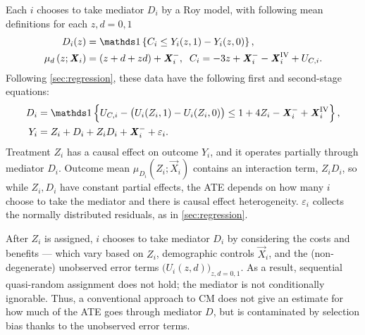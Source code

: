 Each $i$ chooses to take mediator $D_i$ by a Roy model, with following mean definitions for each $z, d = 0, 1$
\begin{align*}
    D_i(z) &= \indicator{C_i \leq Y_i(z, 1) - Y_i(z, 0)},  \\
    \mu_{d}\left(z ; \vec X_i \right) &= \left( z + d + z d \right) + \vec X_i^-,
    \;\; C_i = -3z + \vec X_i^- - \vec X_i^{\text{IV}} + U_{C,i}.
\end{align*}
Following \autoref{sec:regression}, these data have the following first and second-stage equations:
\begin{align*}
    D_i &= \indicator{U_{C,i} - \big( U_i(Z_i,1) - U_i(Z_i,0) \big)
    \leq 1 + 4 Z_i - \vec X_i^- +\vec X_i^{\mathrm{IV}}},  \\
    Y_i &= Z_i + D_i + Z_i D_i + \vec X_i^- + \varepsilon_i.
\end{align*}
Treatment $Z_i$ has a causal effect on outcome $Y_i$, and it operates partially through mediator $D_i$.
Outcome mean $\mu_{D_i}\left( Z_i; \vec X_i \right)$ contains an interaction term, $Z_i D_i$, so while $Z_i,D_i$ have constant partial effects, the ATE depends on how many $i$ choose to take the mediator and there is causal effect heterogeneity.
$\varepsilon_i$ collects the normally distributed residuals, as in \autoref{sec:regression}.

After $Z_i$ is assigned, $i$ chooses to take mediator $D_i$ by considering the costs and benefits --- which vary based on $Z_i$, demographic controls $\vec X_i$, and the (non-degenerate) unobserved error terms $ \Big( U_i(z,d) \Big)_{z,d = 0,1}$.
As a result, sequential quasi-random assignment does not hold; the mediator is not conditionally ignorable.
Thus, a conventional approach to CM does not give an estimate for how much of the ATE goes through mediator $D$, but is contaminated by selection bias thanks to the unobserved error terms.

